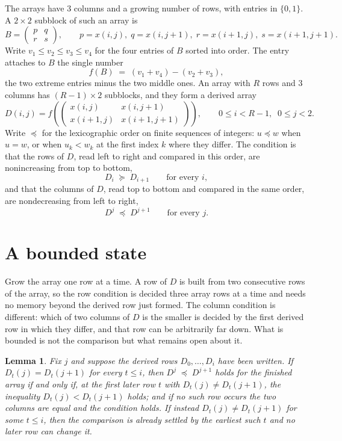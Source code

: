 \documentclass[11pt,a4paper]{article}
\theoremstyle{plain}
\newtheorem{lemma}[theorem]{Lemma}
\theoremstyle{definition}
\begin{document}
The arrays have $3$ columns and a growing number of rows, with entries in $\{0,1\}$. A
$2\times2$ subblock of such an array is
\[
B=\begin{pmatrix} p & q \\ r & s \end{pmatrix},
\qquad p=x(i,j),\; q=x(i,j+1),\; r=x(i+1,j),\; s=x(i+1,j+1).
\]
Write $v_1\le v_2\le v_3\le v_4$ for the four entries of $B$ sorted into order. The entry attaches to $B$ the single number
\[
f(B)\;=\;(v_1+v_4)-(v_2+v_3),
\]
the two extreme entries minus the two middle ones. An array with $R$ rows and $3$ columns has $(R-1)\times2$ subblocks, and they
form a derived array
\[
D(i,j)=f\!\left(\begin{pmatrix} x(i,j) & x(i,j+1) \\ x(i+1,j) & x(i+1,j+1)\end{pmatrix}
\right),\qquad 0\le i<R-1,\;\; 0\le j<2 .
\]
Write $\preceq$ for the lexicographic order on finite sequences of integers: $u\preceq w$ when
$u=w$, or when $u_k<w_k$ at the first index $k$ where they differ. The condition is that the
rows of $D$, read left to right and compared in this order, are nonincreasing from top to bottom,
\[
D_{i}\;\succeq\;D_{i+1}\qquad\text{for every } i,
\]
and that the columns of $D$, read top to bottom and compared in the same order, are nondecreasing
from left to right,
\[
D^{j}\;\preceq\;D^{j+1}\qquad\text{for every } j .
\]

\section{A bounded state}

Grow the array one row at a time. A row of $D$ is built from two consecutive rows of the array,
so the row condition is decided three array rows at a time and needs no memory beyond the
derived row just formed. The column condition is different: which of two columns of $D$ is the
smaller is decided by the first derived row in which they differ, and that row can be
arbitrarily far down. What is bounded is not the comparison but what remains open about it.

\begin{lemma}\label{lem:bits}
Fix $j$ and suppose the derived rows $D_0,\dots,D_i$ have been written. If $D_t(j)=D_t(j+1)$ for
every $t\le i$, then $D^{j}\;\preceq\;D^{j+1}$ holds for the finished array if and only if,
at the first later row $t$ with $D_t(j)\neq D_t(j+1)$, the inequality $D_t(j)<D_t(j+1)$
holds; and if no such row occurs the two columns are equal and the condition holds. If instead
$D_t(j)\neq D_t(j+1)$ for some $t\le i$, then the comparison is already settled by the earliest
such $t$ and no later row can change it.
\end{lemma}
\end{document}
